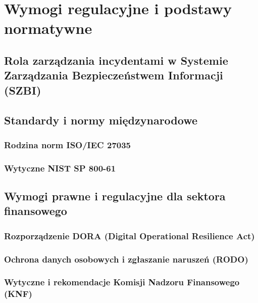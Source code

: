 \chapter{Wymogi regulacyjne i podstawy normatywne}\label{ch:wymogi-regulacyjne}

\section{Rola zarządzania incydentami w Systemie Zarządzania Bezpieczeństwem Informacji (SZBI)}\label{sec:rola-w-szbi}

\section{Standardy i normy międzynarodowe}\label{sec:standardy-normy}

\subsection{Rodzina norm ISO/IEC 27035}\label{subsec:iso-27035}

\subsection{Wytyczne NIST SP 800-61}\label{subsec:nist-800-61}

\section{Wymogi prawne i regulacyjne dla sektora finansowego}\label{sec:wymogi-regulacyjne}

\subsection{Rozporządzenie DORA (Digital Operational Resilience Act)}\label{subsec:dora}

\subsection{Ochrona danych osobowych i zgłaszanie naruszeń (RODO)}\label{subsec:rodo}

\subsection{Wytyczne i rekomendacje Komisji Nadzoru Finansowego (KNF)}\label{subsec:knf}
